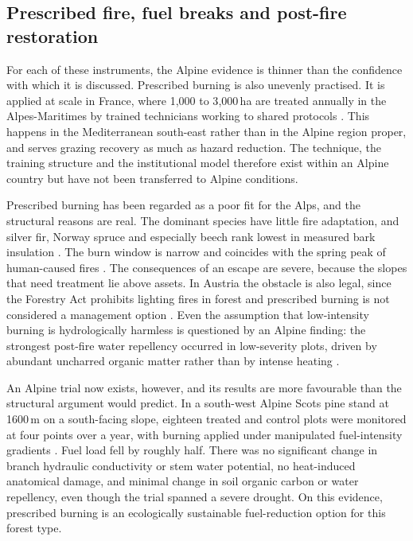 \documentclass[11pt,a4paper]{article}
\begin{document}
\subsection{Prescribed fire, fuel breaks and post-fire restoration}
\label{sec:fuelbreaks}

For each of these instruments, the Alpine evidence is thinner than the confidence with which it is discussed. Prescribed burning is also unevenly practised. It is applied at scale in France, where 1{,}000 to 3{,}000\,ha are treated annually in the Alpes-Maritimes by trained technicians working to shared protocols \citep{muller_forest_2020}. This happens in the Mediterranean south-east rather than in the Alpine region proper, and serves grazing recovery as much as hazard reduction. The technique, the training structure and the institutional model therefore exist within an Alpine country but have not been transferred to Alpine conditions.

Prescribed burning has been regarded as a poor fit for the Alps, and the structural reasons are real. The dominant species have little fire adaptation, and silver fir, Norway spruce and especially beech rank lowest in measured bark insulation \citep{mutterer_bark_2026, dupire_vulnerability_2019}. The burn window is narrow and coincides with the spring peak of human-caused fires \citep{muller_forest_2020}. The consequences of an escape are severe, because the slopes that need treatment lie above assets. In Austria the obstacle is also legal, since the Forestry Act prohibits lighting fires in forest and prescribed burning is not considered a management option \citep{neumann_fuel_2022}. Even the assumption that low-intensity burning is hydrologically harmless is questioned by an Alpine finding: the strongest post-fire water repellency occurred in low-severity plots, driven by abundant uncharred organic matter rather than by intense heating \citep{negri_wildfire_2026}.

An Alpine trial now exists, however, and its results are more favourable than the structural argument would predict. In a south-west Alpine Scots pine stand at 1600\,m on a south-facing slope, eighteen treated and control plots were monitored at four points over a year, with burning applied under manipulated fuel-intensity gradients \citep{gamba_prescribed_2025}. Fuel load fell by roughly half. There was no significant change in branch hydraulic conductivity or stem water potential, no heat-induced anatomical damage, and minimal change in soil organic carbon or water repellency, even though the trial spanned a severe drought. On this evidence, prescribed burning is an ecologically sustainable fuel-reduction option for this forest type.
\end{document}
